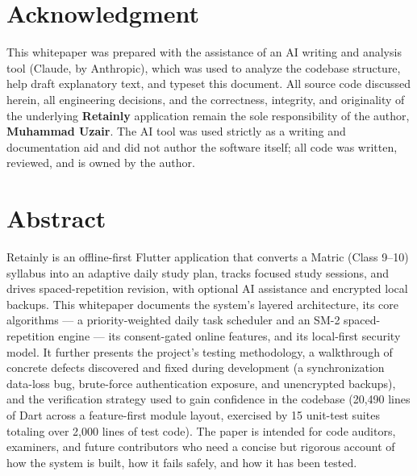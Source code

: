 \documentclass[11pt,a4paper]{article}
\begin{document}
\section*{Acknowledgment}
\begin{tcolorbox}[colback=softgray,colframe=borderline,boxrule=0.6pt,arc=2pt,left=10pt,right=10pt,top=8pt,bottom=8pt]
This whitepaper was prepared with the assistance of an AI writing and analysis tool (Claude, by Anthropic), which was used to analyze the codebase structure, help draft explanatory text, and typeset this document. All source code discussed herein, all engineering decisions, and the correctness, integrity, and originality of the underlying \textbf{Retainly} application remain the sole responsibility of the author, \textbf{Muhammad Uzair}. The AI tool was used strictly as a writing and documentation aid and did not author the software itself; all code was written, reviewed, and is owned by the author.
\end{tcolorbox}

\vspace{0.4cm}

\section*{Abstract}
Retainly is an offline-first Flutter application that converts a Matric (Class 9--10) syllabus into an adaptive daily study plan, tracks focused study sessions, and drives spaced-repetition revision, with optional AI assistance and encrypted local backups. This whitepaper documents the system's layered architecture, its core algorithms --- a priority-weighted daily task scheduler and an SM-2 spaced-repetition engine --- its consent-gated online features, and its local-first security model. It further presents the project's testing methodology, a walkthrough of concrete defects discovered and fixed during development (a synchronization data-loss bug, brute-force authentication exposure, and unencrypted backups), and the verification strategy used to gain confidence in the codebase (20{,}490 lines of Dart across a feature-first module layout, exercised by 15 unit-test suites totaling over 2{,}000 lines of test code). The paper is intended for code auditors, examiners, and future contributors who need a concise but rigorous account of how the system is built, how it fails safely, and how it has been tested.
\end{document}
